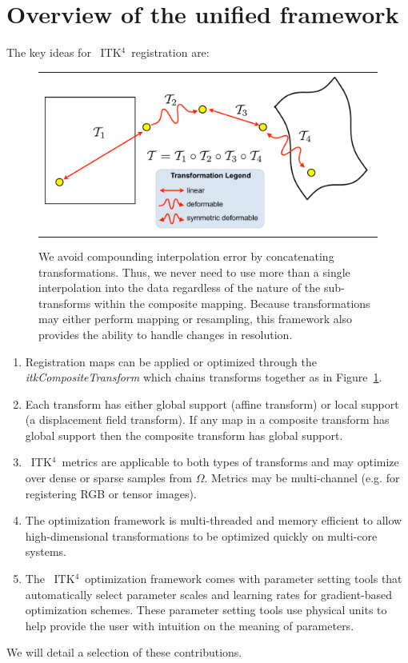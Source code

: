\documentclass{llncs}
\newcommand{\tk}{~ITK$^{\text{4}}$~}
\begin{document}
\section{Overview of the unified framework}
The key ideas for \tk registration are:
\begin{figure}[t]
\begin{center}
\begin{tabular}{c}
\includegraphics[width=4.5in]{figs/composemap.pdf}
\end{tabular}
\caption{\baselineskip 12pt \small We avoid compounding interpolation
  error by concatenating transformations.  Thus, we never need to use more than
  a single interpolation into the data regardless of the nature of the
  sub-transforms within the composite mapping.  Because transformations may
  either perform mapping or resampling, this framework also
  provides the ability to handle changes in resolution.}
\label{fig:composite}
\end{center}
\end{figure}
\begin{enumerate}
\item Registration maps can be applied or optimized through the {\em
    itkCompositeTransform} which chains transforms together as in Figure~\ref{fig:composite}.
\item Each transform has either global support (affine
  transform) or local support (a displacement field transform).   If
  any map in a composite transform has global support then the
  composite transform has global support.
\item \tk metrics are applicable to both types of transforms and may
  optimize over dense or sparse samples from $\Omega$.  Metrics may be
  multi-channel (e.g. for registering RGB or tensor images).
\item The optimization framework is multi-threaded and memory
  efficient to allow high-dimensional transformations to be optimized
  quickly on multi-core systems.
\item The \tk optimization framework comes with parameter setting tools
  that automatically select parameter scales and learning rates for
  gradient-based optimization schemes.  These parameter setting tools
  use physical units to help provide the user with intuition on the
  meaning of parameters.  
\end{enumerate}
We will detail a selection of these contributions. 
\end{document}
